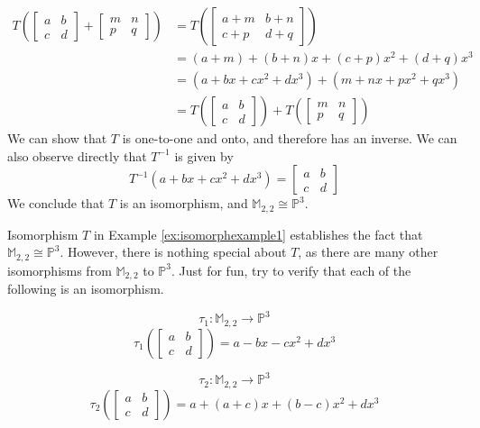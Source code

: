 \documentclass{ximera}
\begin{document}
\begin{example}
\begin{explanation}
\begin{align*}
    T\left(\begin{bmatrix}a&b\\c&d\end{bmatrix}+\begin{bmatrix}m&n\\p&q\end{bmatrix}\right)&=T\left(\begin{bmatrix}a+m&b+n\\c+p&d+q\end{bmatrix}\right)\\
    &=(a+m)+(b+n)x+(c+p)x^2+(d+q)x^3\\
    &=(a+bx+cx^2+dx^3)+(m+nx+px^2+qx^3)\\
    &=T\left(\begin{bmatrix}a&b\\c&d\end{bmatrix}\right)+T\left(\begin{bmatrix}m&n\\p&q\end{bmatrix}\right)
\end{align*}
We can show that $T$ is one-to-one and onto, and therefore has an inverse.  We can also observe directly that $T^{-1}$ is given by 
$$T^{-1}(a+bx+cx^2+dx^3)=\begin{bmatrix}a&b\\c&d\end{bmatrix}$$
We conclude that $T$ is an isomorphism, and $\mathbb{M}_{2,2}\cong\mathbb{P}^3$.
\end{explanation}
\end{example}
Isomorphism $T$ in Example \ref{ex:isomorphexample1} establishes the fact that $\mathbb{M}_{2,2}\cong\mathbb{P}^3$. However, there is nothing special about $T$, as there are many other isomorphisms from $\mathbb{M}_{2,2}$ to $\mathbb{P}^3$.  Just for fun, try to verify that each of the following is an isomorphism.

\begin{equation}\label{eq:justforfuniso1}\tau_1:\mathbb{M}_{2,2}\rightarrow\mathbb{P}^3\end{equation}
$$\tau_1\left(\begin{bmatrix}a&b\\c&d\end{bmatrix}\right)=a-bx-cx^2+dx^3$$

\begin{equation}\label{eq:justforfuniso2}\tau_2:\mathbb{M}_{2,2}\rightarrow\mathbb{P}^3\end{equation}
$$\tau_2\left(\begin{bmatrix}a&b\\c&d\end{bmatrix}\right)=a+(a+c)x+(b-c)x^2+dx^3$$
\end{document}
